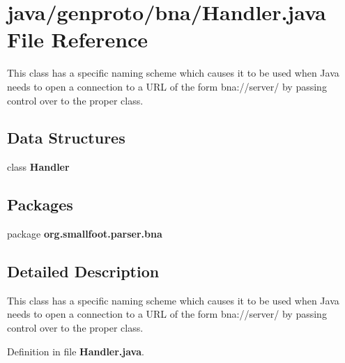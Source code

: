 \section{java/genproto/bna/\+Handler.java File Reference}
\label{bna_2Handler_8java}


This class has a specific naming scheme which causes it to be used when Java needs to open a connection to a U\+R\+L of the form bna\+://server/ by passing control over to the proper class.  


\subsection*{Data Structures}
\begin{DoxyCompactItemize}
\item 
class {\bf Handler}
\end{DoxyCompactItemize}
\subsection*{Packages}
\begin{DoxyCompactItemize}
\item 
package {\bf org.\+smallfoot.\+parser.\+bna}
\end{DoxyCompactItemize}


\subsection{Detailed Description}
This class has a specific naming scheme which causes it to be used when Java needs to open a connection to a U\+R\+L of the form bna\+://server/ by passing control over to the proper class. 



Definition in file {\bf Handler.\+java}.

